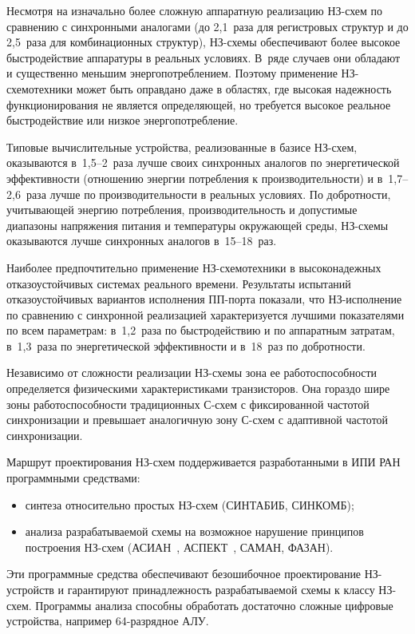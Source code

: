 \begin{multicols}{2}
       Несмотря на изначально более сложную аппаратную реализацию НЗ-схем по 
сравнению с синхронными аналогами (до 2,1~раза для регистровых структур и до 2,5~раза 
для комбинационных структур), НЗ-схе\-мы обеспечивают более высокое быстродействие 
аппаратуры в реальных условиях. В~ряде случаев они обладают и существенно меньшим 
энергопотреблением. Поэтому применение НЗ-схе\-мо\-тех\-ни\-ки может быть оправдано 
даже в областях, где высокая надежность функционирования не является определяющей, но 
требуется высокое реальное быстродействие или низкое энергопотребление.
       
       Типовые вычислительные устройства, реализованные в базисе НЗ-схем, 
оказываются в~1,5--2~раза лучше своих синхронных аналогов по энергетической 
эффективности (отношению энергии по\-треб\-ле\-ния к производительности) и в~1,7--2,6~раза 
лучше по производительности в реальных условиях. По добротности, учитывающей энергию 
потребления, производительность и допустимые диапазоны напряжения питания и 
температуры окружающей среды, НЗ-схемы оказываются лучше синхронных аналогов в~15--18~раз.
       
       Наиболее предпочтительно применение НЗ-схе\-мо\-тех\-ни\-ки в высоконадежных 
отказоустойчивых системах реального времени. Результаты испытаний отказоустойчивых 
вариантов исполнения ПП-порта показали, что НЗ-ис\-пол\-не\-ние по сравнению с 
синхронной реализацией характеризуется лучшими показателями по всем параметрам: 
в~1,2~раза по быстродействию и по аппаратным затратам, в~1,3~раза по энергетической 
эффективности и в~18~раз по добротности.
       
       Независимо от сложности реализации НЗ-схе\-мы зона ее работоспособности 
определяется физическими характеристиками транзисторов. Она гораздо шире зоны 
работоспособности традиционных С-схем с фиксированной частотой 
синхронизации и превышает аналогичную зону С-схем с адаптивной частотой 
синхронизации.
       
       Маршрут проектирования НЗ-схем поддерживается разработанными в ИПИ РАН 
программными средствами:
       \begin{itemize}
\item синтеза относительно простых НЗ-схем (\mbox{СИНТАБИБ}, СИНКОМБ);
\item анализа разрабатываемой схемы на возможное нарушение принципов построения 
НЗ-схем (АСИАН~\cite{78-sok}, АСПЕКТ~\cite{51-sok}, САМАН, ФАЗАН).
\end{itemize}

       Эти программные средства обеспечивают без\-оши\-бочное проектирование 
       НЗ-устройств и гарантируют принадлежность разрабатываемой схемы к классу 
       НЗ-схем. Программы анализа способны обработать достаточно сложные цифровые устройства, 
например 64-раз\-ряд\-ное АЛУ. 
       

\end{multicols}
